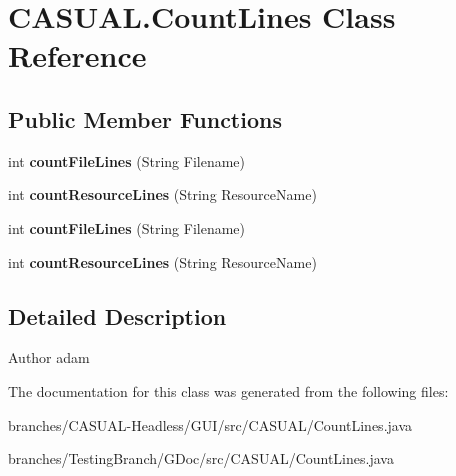 \hypertarget{classCASUAL_1_1CountLines}{\section{C\-A\-S\-U\-A\-L.\-Count\-Lines Class Reference}
\label{classCASUAL_1_1CountLines}
}
\subsection*{Public Member Functions}
\begin{DoxyCompactItemize}
\item 
\hypertarget{classCASUAL_1_1CountLines_a5bdad6b7a532e6447b8261abe908e1b4}{int {\bfseries count\-File\-Lines} (String Filename)}\label{classCASUAL_1_1CountLines_a5bdad6b7a532e6447b8261abe908e1b4}

\item 
\hypertarget{classCASUAL_1_1CountLines_a5e38da91ee4a1578b101ec722a06af94}{int {\bfseries count\-Resource\-Lines} (String Resource\-Name)}\label{classCASUAL_1_1CountLines_a5e38da91ee4a1578b101ec722a06af94}

\item 
\hypertarget{classCASUAL_1_1CountLines_a5bdad6b7a532e6447b8261abe908e1b4}{int {\bfseries count\-File\-Lines} (String Filename)}\label{classCASUAL_1_1CountLines_a5bdad6b7a532e6447b8261abe908e1b4}

\item 
\hypertarget{classCASUAL_1_1CountLines_a5e38da91ee4a1578b101ec722a06af94}{int {\bfseries count\-Resource\-Lines} (String Resource\-Name)}\label{classCASUAL_1_1CountLines_a5e38da91ee4a1578b101ec722a06af94}

\end{DoxyCompactItemize}


\subsection{Detailed Description}
\begin{DoxyAuthor}{Author}
adam 
\end{DoxyAuthor}


The documentation for this class was generated from the following files\-:\begin{DoxyCompactItemize}
\item 
branches/\-C\-A\-S\-U\-A\-L-\/\-Headless/\-G\-U\-I/src/\-C\-A\-S\-U\-A\-L/Count\-Lines.\-java\item 
branches/\-Testing\-Branch/\-G\-Doc/src/\-C\-A\-S\-U\-A\-L/Count\-Lines.\-java\end{DoxyCompactItemize}
